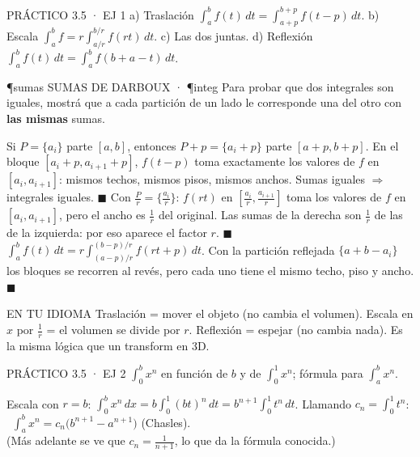 \begin{enunciado}{PRÁCTICO 3.5 · EJ 1}
a) Traslación $\int_a^bf(t)\,dt=\int_{a+p}^{b+p}f(t-p)\,dt$. b) Escala $\int_a^bf=r\int_{a/r}^{b/r}f(rt)\,dt$. c) Las dos juntas. d) Reflexión $\int_a^bf(t)\,dt=\int_a^bf(b+a-t)\,dt$.
\end{enunciado}
\begin{uso}{\P{sumas} SUMAS DE DARBOUX · \P{integ}}
Para probar que dos integrales son iguales, mostrá que a cada partición de un lado le corresponde una del otro con \textbf{las mismas} sumas.
\end{uso}
Si $P=\{a_i\}$ parte $[a,b]$, entonces $P+p=\{a_i+p\}$ parte $[a+p,b+p]$. En el bloque $[a_i+p,a_{i+1}+p]$, $f(t-p)$ toma exactamente los valores de $f$ en $[a_i,a_{i+1}]$: mismos techos, mismos pisos, mismos anchos. Sumas iguales $\Rightarrow$ integrales iguales. $\blacksquare$
Con $\frac Pr=\{\frac{a_i}r\}$: $f(rt)$ en $[\frac{a_i}r,\frac{a_{i+1}}r]$ toma los valores de $f$ en $[a_i,a_{i+1}]$, pero el ancho es $\frac1r$ del original. Las sumas de la derecha son $\frac1r$ de las de la izquierda: por eso aparece el factor $r$. $\blacksquare$
$\int_a^bf(t)\,dt=r\int_{(a-p)/r}^{(b-p)/r}f(rt+p)\,dt$.
Con la partición reflejada $\{a+b-a_i\}$ los bloques se recorren al revés, pero cada uno tiene el mismo techo, piso y ancho. $\blacksquare$
\begin{tip}{EN TU IDIOMA}
Traslación = mover el objeto (no cambia el volumen). Escala en $x$ por $\frac1r$ = el volumen se divide por $r$. Reflexión = espejar (no cambia nada). Es la misma lógica que un transform en 3D.
\end{tip}

\begin{enunciado}{PRÁCTICO 3.5 · EJ 2}
$\int_0^bx^n$ en función de $b$ y de $\int_0^1x^n$; fórmula para $\int_a^bx^n$.
\end{enunciado}
Escala con $r=b$: $\int_0^bx^n\,dx=b\int_0^1(bt)^n\,dt=b^{n+1}\int_0^1t^n\,dt$. Llamando $c_n=\int_0^1t^n$: \ $\int_a^bx^n=c_n\big(b^{n+1}-a^{n+1}\big)$ (Chasles).\\
(Más adelante se ve que $c_n=\frac1{n+1}$, lo que da la fórmula conocida.)

